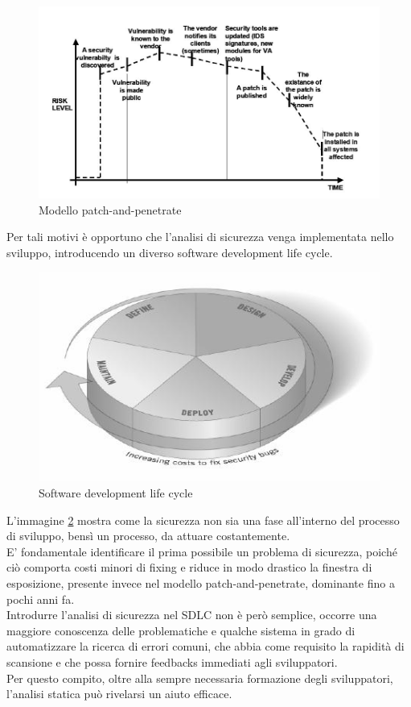 \begin{figure}[!h]
\centering
\includegraphics[width=15cm]{patchpenetrate.jpg}
\caption{Modello patch-and-penetrate}\label{pep}
\end{figure}


Per tali motivi è opportuno che l'analisi di sicurezza venga implementata nello sviluppo, introducendo un diverso software development life cycle.

\begin{figure}[!h]
\centering
\includegraphics[width=15cm]{sdlc.jpg}
\caption{Software development life cycle}\label{sdlc}
\end{figure}

L'immagine \ref{sdlc} mostra come la sicurezza non sia una fase all'interno del processo di sviluppo, bensì un processo, da attuare costantemente.\\
E' fondamentale identificare il prima possibile un problema di sicurezza, poiché ciò comporta costi minori di fixing e riduce in modo drastico la finestra di esposizione, presente invece nel modello patch-and-penetrate, dominante fino a pochi anni fa. \\
Introdurre l'analisi di sicurezza nel SDLC non è però semplice, occorre una maggiore conoscenza delle problematiche e qualche sistema in grado di automatizzare la ricerca di errori comuni, che abbia come requisito la rapidità di scansione e che possa fornire feedbacks immediati agli sviluppatori.\\
Per questo compito, oltre alla sempre necessaria formazione degli sviluppatori, l'analisi statica può rivelarsi un aiuto efficace.